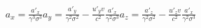 \documentclass[preview]{standalone}
\begin{document}
\begin{align*}
a_x = \frac{a'_x}{\gamma^3 \sigma^3} a_y = \frac{a'_y}{\gamma^2 \sigma^2} - \frac{u'_y v}{c^2} \frac{a'_x}{\gamma^2 \sigma^3} a_z = \frac{a'_z}{\gamma^2 \sigma^2} - \frac{u'_z v}{c^2} \frac{a'_x}{\gamma^2 \sigma^3}
\end{align*}
\end{document}
